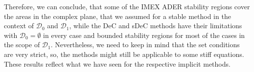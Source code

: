 Therefore, we can conclude, that some of the IMEX ADER stability regions cover the areas in the complex plane, that we assumed for a stable method in the context of $\mathcal{D}_0$ and $\mathcal{D}_1$, while the DeC and sDeC methods have their limitations with $\mathcal{D}_0= \emptyset$ in every case and bounded stability regions for most of the cases in the scope of $\mathcal{D}_1$. Nevertheless, we need to keep in mind that the set conditions are very strict, so,  the methods might still be applicable to some stiff equations. %
These results reflect what we have seen for the respective implicit methods.
 